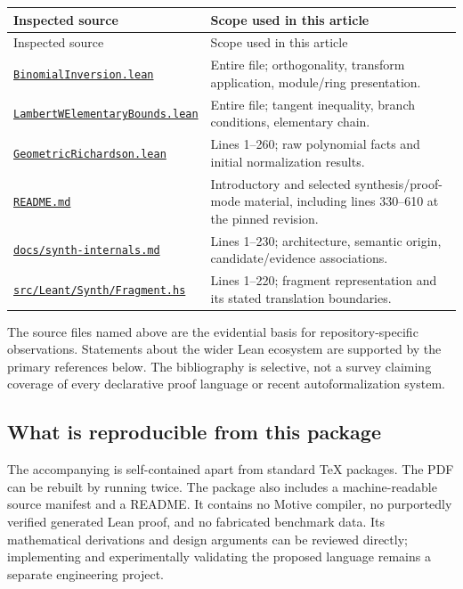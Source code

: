 \documentclass[11pt,a4paper]{article}
\newcommand{\code}[1]{\texttt{\detokenize{#1}}}
\newcommand{\pfile}[1]{\href{https://github.com/VladimirReshetnikov/ProveIt/blob/24ce8bd743eaab64a91ce90725ea00f498d319d2/Analysis/FabiusFunction/Lean/FabiusFunction/#1}{\nolinkurl{#1}}}
\newcommand{\lfile}[1]{\href{https://github.com/VladimirReshetnikov/Leant/blob/c36adf114035fb2fba6c276b63944cc613b31668/#1}{\nolinkurl{#1}}}
\theoremstyle{remark}
\begin{document}
\begin{longtable}{@{}p{}p{}@{}}
\toprule
Inspected source & Scope used in this article\\
\midrule
\endfirsthead
\toprule Inspected source & Scope used in this article\\\midrule
\endhead
\pfile{BinomialInversion.lean} & Entire file; orthogonality, transform application, module/ring presentation.\\
\pfile{LambertWElementaryBounds.lean} & Entire file; tangent inequality, branch conditions, elementary chain.\\
\pfile{GeometricRichardson.lean} & Lines 1--260; raw polynomial facts and initial normalization results.\\
\lfile{README.md} & Introductory and selected synthesis/proof-mode material, including lines 330--610 at the pinned revision.\\
\lfile{docs/synth-internals.md} & Lines 1--230; architecture, semantic origin, candidate/evidence associations.\\
\lfile{src/Leant/Synth/Fragment.hs} & Lines 1--220; fragment representation and its stated translation boundaries.\\
\bottomrule
\end{longtable}
The source files named above are the evidential basis for repository-specific observations. Statements about the wider Lean ecosystem are supported by the primary references below. The bibliography is selective, not a survey claiming coverage of every declarative proof language or recent autoformalization system.

\subsection*{What is reproducible from this package}
The accompanying \code{motive.tex} is self-contained apart from standard TeX packages. The PDF can be rebuilt by running \code{pdflatex} twice. The package also includes a machine-readable source manifest and a README. It contains no Motive compiler, no purportedly verified generated Lean proof, and no fabricated benchmark data. Its mathematical derivations and design arguments can be reviewed directly; implementing and experimentally validating the proposed language remains a separate engineering project.
\end{document}
